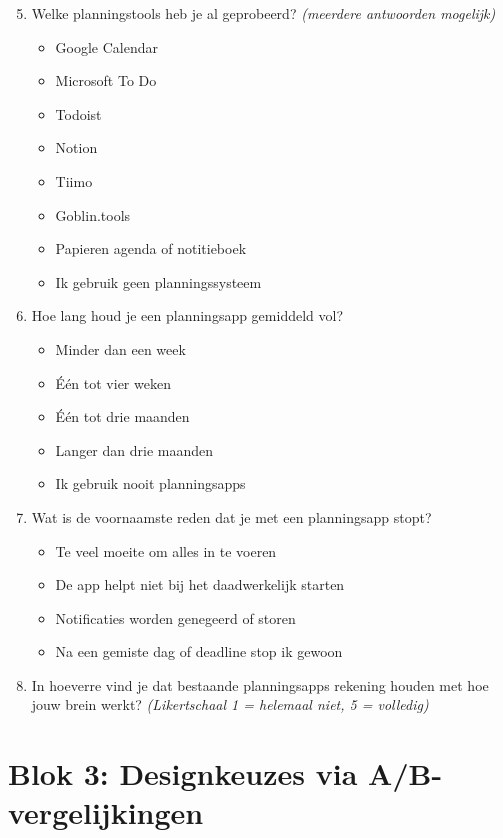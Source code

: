 \begin{enumerate}
  \setcounter{enumi}{4}
  \item Welke planningstools heb je al geprobeerd? \textit{(meerdere antwoorden mogelijk)}
  \begin{itemize}
    \item Google Calendar
    \item Microsoft To Do
    \item Todoist
    \item Notion
    \item Tiimo
    \item Goblin.tools
    \item Papieren agenda of notitieboek
    \item Ik gebruik geen planningssysteem
  \end{itemize}
  \item Hoe lang houd je een planningsapp gemiddeld vol?
  \begin{itemize}
    \item Minder dan een week
    \item Één tot vier weken
    \item Één tot drie maanden
    \item Langer dan drie maanden
    \item Ik gebruik nooit planningsapps
  \end{itemize}
  \item Wat is de voornaamste reden dat je met een planningsapp stopt?
  \begin{itemize}
    \item Te veel moeite om alles in te voeren
    \item De app helpt niet bij het daadwerkelijk starten
    \item Notificaties worden genegeerd of storen
    \item Na een gemiste dag of deadline stop ik gewoon
  \end{itemize}
  \item In hoeverre vind je dat bestaande planningsapps rekening houden met
  hoe jouw brein werkt? \textit{(Likertschaal 1 = helemaal niet, 5 = volledig)}
\end{enumerate}

\section*{Blok 3: Designkeuzes via A/B-vergelijkingen}

